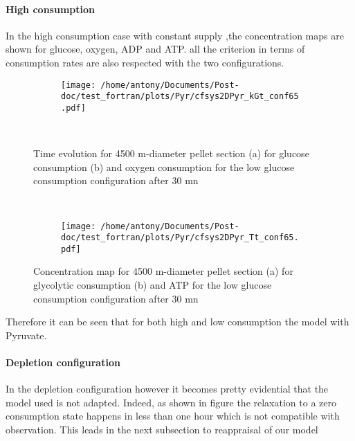 \documentclass[11pt,a4paper]{article}
\begin{document}
\paragraph{High consumption}
In the high consumption case with constant supply ,the concentration maps are shown for glucose, oxygen, ADP and ATP. all the criterion in terms of consumption rates are also respected with the two configurations.
\begin{figure}[ht!]
	\begin{subfigure}{0.45\textwidth}
	\centering
	\texttt{[image: /home/antony/Documents/Post-doc/test\_fortran/plots/Pyr/cfsys2DPyr\_kGt\_conf65.pdf]}
	\caption{ \label{PkGt_con65}}
	\end{subfigure}
	~~
	\begin{subfigure}{0.45\textwidth}
		\caption{ \label{PkOt_conf65}}
	\end{subfigure}
	\caption{Time evolution for 4500 \textmu m-diameter pellet section  (a) for glucose consumption (b) and oxygen consumption \label{Pconf65} for the low glucose consumption configuration after 30 mn }
\end{figure}

\begin{figure}[ht!]
	\begin{subfigure}{0.45\textwidth}
	\centering
	\caption{ \label{PkGy_con65}}
	\end{subfigure}
	~~
	\begin{subfigure}{0.45\textwidth}
	\texttt{[image: /home/antony/Documents/Post-doc/test\_fortran/plots/Pyr/cfsys2DPyr\_Tt\_conf65.pdf]}
		\caption{ \label{PT_conf65}}
	\end{subfigure}
	\caption{Concentration map for 4500 \textmu m-diameter pellet section  (a) for glycolytic consumption (b) and ATP \label{Pconf65} for the low glucose consumption configuration after 30 mn}
\end{figure}
Therefore it can be seen that for both high and low consumption the model with Pyruvate.

\paragraph{Depletion configuration}
In the depletion configuration however it becomes pretty evidential that the model used is not adapted. Indeed, as shown in figure   the relaxation to a zero consumption state happens in less than one hour which is not compatible with observation. This leads in the next subsection to reappraisal of our model
\end{document}
